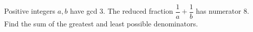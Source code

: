 Positive integers $a,b$ have gcd $3$. The reduced fraction $\dfrac{1}{a}+\dfrac{1}{b}$ has numerator $8$. Find the sum of the greatest and least possible denominators.
